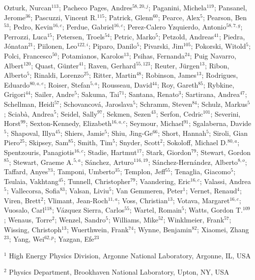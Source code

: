Ozturk, Nurcan$^{113}$;
Pacheco Pages, Andres$^{58,20,j}$;
Paganini, Michela$^{119}$;
Pansanel, Jerome$^{36}$;
Pascuzzi, Vincent R.$^{115}$;
Patrick, Glenn$^{60}$;
Pearce, Alex$^{5}$;
Pearson, Ben$^{53}$;
Pedro, Kevin$^{16,c}$;
Perdue, Gabriel$^{16,c}$;
Perez-Calero Yzquierdo, Antonio$^{58,7,g}$;
Perrozzi, Luca$^{15}$;
Petersen, Troels$^{54}$;
Petric, Marko$^{5}$;
Petzold, Andreas$^{41}$;
Piedra, Jónatan$^{21}$;
Piilonen, Leo$^{122,i}$;
Piparo, Danilo$^{5}$;
Pivarski, Jim$^{105}$;
Pokorski, Witold$^{5}$;
Polci, Francesco$^{50}$;
Potamianos, Karolos$^{13}$;
Psihas, Fernanda$^{24}$;
Puig Navarro, Albert$^{120}$;
Quast, Günter$^{41}$;
Raven, Gerhard$^{55,123}$;
Reuter, Jürgen$^{13}$;
Ribon, Alberto$^{5}$;
Rinaldi, Lorenzo$^{25}$;
Ritter, Martin$^{48}$;
Robinson, James$^{13}$;
Rodrigues, Eduardo$^{80,a,e}$;
Roiser, Stefan$^{5,a}$;
Rousseau, David$^{44}$;
Roy, Gareth$^{85}$;
Rybkine, Grigori$^{44}$;
Sailer, Andre$^{5}$;
Sakuma, Tai$^{71}$;
Santana, Renato$^{3}$;
Sartirana, Andrea$^{47}$;
Schellman, Heidi$^{57}$;
Schovancová, Jaroslava$^{5}$;
Schramm, Steven$^{84}$;
Schulz, Markus$^{5}$;
Sciabà, Andrea$^{5}$;
Seidel, Sally$^{97}$;
Sekmen, Sezen$^{43}$;
Serfon, Cedric$^{101}$;
Severini, Horst$^{99}$;
Sexton-Kennedy, Elizabeth$^{16,a,c}$;
Seymour, Michael$^{91}$;
Sgalaberna, Davide$^{5}$;
Shapoval, Illya$^{45}$;
Shiers, Jamie$^{5}$;
Shiu, Jing-Ge$^{66}$;
Short, Hannah$^{5}$;
Siroli, Gian Piero$^{25}$;
Skipsey, Sam$^{85}$;
Smith, Tim$^{5}$;
Snyder, Scott$^{2}$;
Sokoloff, Michael D.$^{80,a}$;
Spentzouris, Panagiotis$^{16,c}$;
Stadie, Hartmut$^{17}$;
Stark, Giordon$^{79}$;
Stewart, Gordon$^{85}$;
Stewart, Graeme A.$^{5,a}$;
Sánchez, Arturo$^{116,19}$;
Sánchez-Hernández, Alberto$^{8,o}$;
Taffard, Anyes$^{73}$;
Tamponi, Umberto$^{35}$;
Templon, Jeff$^{55}$;
Tenaglia, Giacomo$^{5}$;
Tsulaia, Vakhtang$^{45}$;
Tunnell, Christopher$^{79}$;
Vaandering, Eric$^{16,c}$;
Valassi, Andrea$^{5}$;
Vallecorsa, Sofia$^{83}$;
Valsan, Liviu$^{5}$;
Van Gemmeren, Peter$^{1}$;
Vernet, Renaud$^{4}$;
Viren, Brett$^{2}$;
Vlimant, Jean-Roch$^{11,a}$;
Voss, Christian$^{13}$;
Votava, Margaret$^{16,c}$;
Vuosalo, Carl$^{118}$;
Vázquez Sierra, Carlos$^{55}$;
Wartel, Romain$^{5}$;
Watts, Gordon T.$^{109}$;
Wenaus, Torre$^{2}$;
Wenzel, Sandro$^{5}$;
Williams, Mike$^{52}$;
Winklmeier, Frank$^{57}$;
Wissing, Christoph$^{13}$;
Wuerthwein, Frank$^{74}$;
Wynne, Benjamin$^{82}$;
Xiaomei, Zhang$^{23}$;
Yang, Wei$^{62,p}$;
Yazgan, Efe$^{23}$
\bigskip
\par {\footnotesize $^{1}$ High Energy Physics Division, Argonne National Laboratory, Argonne, IL, USA}
\par {\footnotesize $^{2}$ Physics Department, Brookhaven National Laboratory, Upton, NY, USA}
